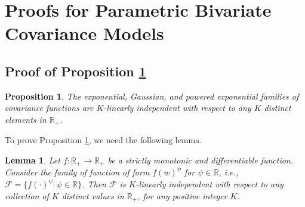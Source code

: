 \documentclass[11pt]{article}
\newtheorem{lemma}{Lemma}
\newtheorem{proposition}{Proposition}
\theoremstyle{definition}
\theoremstyle{remark}
\begin{document}
\section{Proofs for Parametric Bivariate Covariance Models}\label{sec:proofs-continuous-bivariate}

\subsection{Proof of Proposition \ref{prop:K-linind}}

\begin{proposition}\label{prop:K-linind}
 The exponential, Gaussian, and powered exponential families of covariance functions are $K$-linearly independent with respect to any $K$ distinct elements in $\mathbb{R}_{+}$. 
\end{proposition}
To prove Proposition \ref{prop:K-linind}, we need the following lemma. 
\begin{lemma}\label{lem:k-linind-generalized}
Let $f: \mathbb{R}_+\to \mathbb{R}_+$ be a strictly monotonic and differentiable function. 
Consider the family of function of form $f(w)^{\psi}$ for  $\psi \in \mathbb{R}$, i.e., 
$\mathcal{F} = \{ f(\cdot)^{\psi}: \psi \in \mathbb{R} \}$.
Then $\mathcal{F}$ is $K$-linearly independent with respect to any collection of $K$ distinct values in $\mathbb{R}_+$, for any positive integer $K$.  
\end{lemma}
\end{document}
